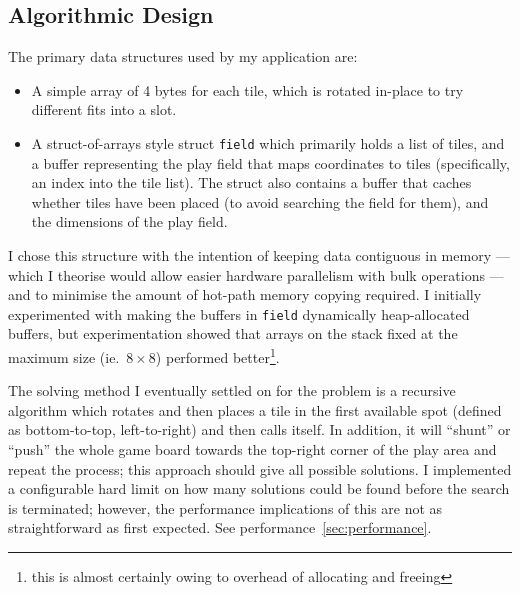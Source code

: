 \documentclass[11pt]{article}
\begin{document}
\subsection{Algorithmic Design}


The primary data structures used by my application are:

\begin{itemize}
  \item A simple array of 4 bytes for each tile, which is rotated in-place to try different fits into a slot.
  \item A struct-of-arrays style struct \verb|field| which primarily holds a list of tiles, and a buffer representing the play field that maps coordinates to tiles (specifically, an index into the tile list).
    The struct also contains a buffer that caches whether tiles have been placed (to avoid searching the field for them), and the dimensions of the play field.
\end{itemize}

I chose this structure with the intention of keeping data contiguous in memory --- which I theorise would allow easier hardware parallelism with bulk operations --- and to minimise the amount of hot-path memory copying required.
I initially experimented with making the buffers in \verb|field| dynamically heap-allocated buffers, but experimentation showed that arrays on the stack fixed at the maximum size (ie.\ $8 \times 8$) performed better\footnote{this is almost certainly owing to overhead of allocating and freeing}.


The solving method I eventually settled on for the problem is a recursive algorithm which rotates and then places a tile in the first available spot (defined as bottom-to-top, left-to-right) and then calls itself.
In addition, it will ``shunt'' or ``push'' the whole game board towards the top-right corner of the play area and repeat the process; this approach should give all possible solutions.
I implemented a configurable hard limit on how many solutions could be found before the search is terminated; however, the performance implications of this are not as straightforward as first expected.
See performance~\ref{sec:performance}.
\end{document}
